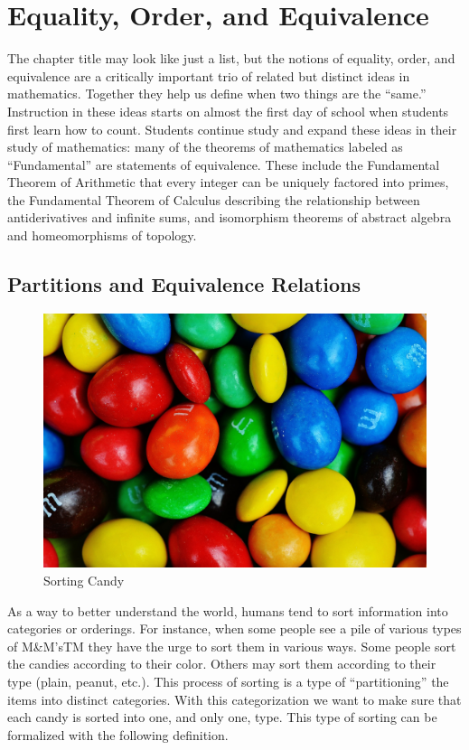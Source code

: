 \documentclass[
]{book}
\theoremstyle{definition}
\theoremstyle{definition}
\theoremstyle{definition}
\theoremstyle{definition}
\theoremstyle{remark}
\begin{document}
\hypertarget{ch:equivalence}{%
\chapter{Equality, Order, and Equivalence}\label{ch:equivalence}}

The chapter title may look like just a list, but the notions of equality, order, and equivalence are a critically important trio of related but distinct ideas in mathematics. Together they help us define when two things are the ``same.'' Instruction in these ideas starts on almost the first day of school when students first learn how to count. Students continue study and expand these ideas in their study of mathematics: many of the theorems of mathematics labeled as ``Fundamental'' are statements of equivalence. These include the Fundamental Theorem of Arithmetic that every integer can be uniquely factored into primes, the Fundamental Theorem of Calculus describing the relationship between antiderivatives and infinite sums, and isomorphism theorems of abstract algebra and homeomorphisms of topology.

\hypertarget{partitions-and-equivalence-relations}{%
\section{Partitions and Equivalence Relations}\label{partitions-and-equivalence-relations}}

\begin{figure}

{\centering \includegraphics[width=0.5\linewidth]{images/m-and-m-1308543_1920} 

}

\caption{Sorting Candy}\label{fig:unnamed-chunk-10}
\end{figure}

As a way to better understand the world, humans tend to sort information into categories or orderings. For instance, when some people see a pile of various types of M\&M'sTM they have the urge to sort them in various ways. Some people sort the candies according to their color. Others may sort them according to their type (plain, peanut, etc.). This process of sorting is a type of ``partitioning'' the items into distinct categories. With this categorization we want to make sure that each candy is sorted into one, and only one, type. This type of sorting can be formalized with the following definition.
\end{document}
